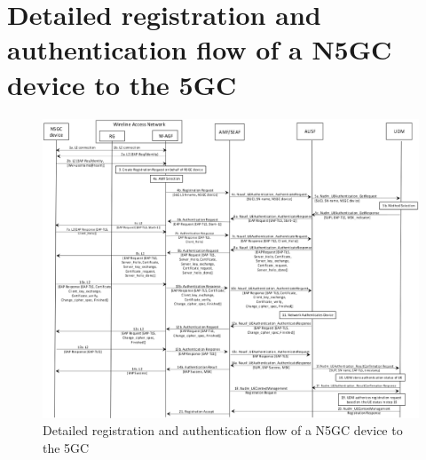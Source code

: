 \chapter{Detailed registration and authentication flow of a \acs{N5GC} device to the \acs{5GC}}
\label{chapter:appendix-d}

\begin{figure}
    \centering
    \includegraphics[width=1\linewidth]{figs/Detailed registration and authentication flow of a non-5G capable device to the 5GC.png}
    \caption{Detailed registration and authentication flow of a \acs{N5GC} device to the \acs{5GC}}
    \label{fig:Detailed registration and authentication flow of a non-5G capable device to the 5GC}
\end{figure}